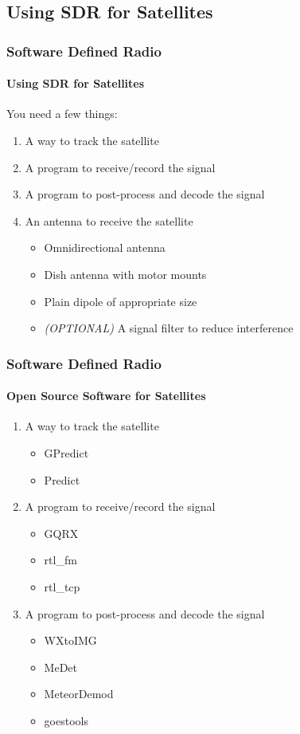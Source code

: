 \documentclass[]{beamer}
\begin{document}
\subsection{Using SDR for Satellites}
\begin{frame}
    \frametitle{Software Defined Radio}
    \framesubtitle{Using SDR for Satellites}
    You need a few things:
    \begin{enumerate}
        \item A way to track the satellite
        \item A program to receive/record the signal
        \item A program to post-process and decode the signal
        \item An antenna to receive the satellite
            \begin{itemize}
                \item Omnidirectional antenna
                \item Dish antenna with motor mounts
                \item Plain dipole of appropriate size
                \item \emph{(OPTIONAL)} A signal filter to reduce interference
            \end{itemize}
    \end{enumerate}
\end{frame}
\begin{frame}
    \frametitle{Software Defined Radio}
    \framesubtitle{Open Source Software for Satellites}
    \begin{enumerate}
        \item A way to track the satellite
            \begin{itemize}
                \item GPredict
                \item Predict
            \end{itemize}
        \item A program to receive/record the signal
            \begin{itemize}
                \item GQRX
                \item rtl\_fm
                \item rtl\_tcp
            \end{itemize}
        \item A program to post-process and decode the signal
            \begin{itemize}
                \item WXtoIMG
                \item MeDet
                \item MeteorDemod
                \item goestools
            \end{itemize}
    \end{enumerate}
\end{frame}
\end{document}

